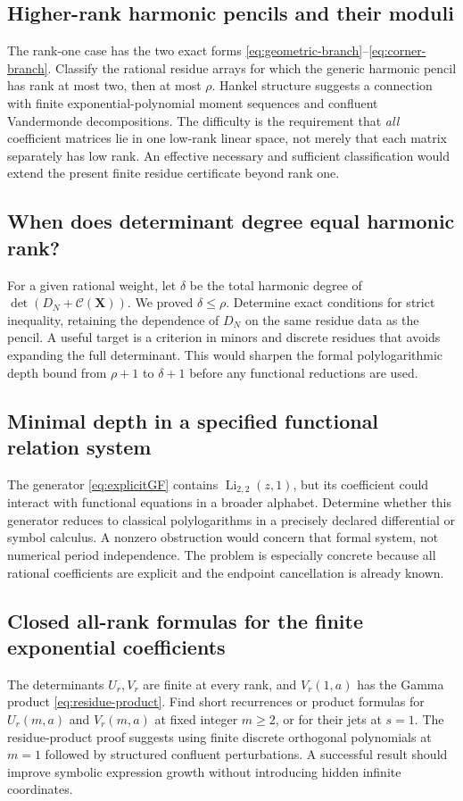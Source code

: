 \documentclass[11pt,letterpaper]{article}
\numberwithin{equation}{section}
\theoremstyle{definition}\newtheorem{definition}[theorem]{Definition}
\theoremstyle{remark}\newtheorem{remark}[theorem]{Remark}
\DeclareMathOperator{\Li}{Li}
\begin{document}
\subsection{Higher-rank harmonic pencils and their moduli}
The rank-one case has the two exact forms
\eqref{eq:geometric-branch}--\eqref{eq:corner-branch}. Classify the
rational residue arrays for which the generic harmonic pencil has rank
at most two, then at most $\rho$. Hankel structure suggests a connection
with finite exponential-polynomial moment sequences and confluent
Vandermonde decompositions. The difficulty is the requirement that
\emph{all} coefficient matrices lie in one low-rank linear space, not
merely that each matrix separately has low rank. An effective necessary
and sufficient classification would extend the present finite residue
certificate beyond rank one.

\subsection{When does determinant degree equal harmonic rank?}
For a given rational weight, let $\delta$ be the total harmonic degree
of $\det(D_N+\mathscr C(\bm X))$. We proved $\delta\le\rho$.
Determine exact conditions for strict inequality, retaining the dependence
of $D_N$ on the same residue data as the pencil. A useful target is a
criterion in minors and discrete residues that avoids expanding the full
determinant. This would sharpen the formal polylogarithmic depth bound
from $\rho+1$ to $\delta+1$ before any functional reductions are used.

\subsection{Minimal depth in a specified functional relation system}
The generator \eqref{eq:explicitGF} contains $\Li_{2,2}(z,1)$, but
its coefficient could interact with functional equations in a broader
alphabet. Determine whether this generator reduces to classical
polylogarithms in a precisely declared differential or symbol calculus.
A nonzero obstruction would concern that formal system, not numerical
period independence. The problem is especially concrete because all
rational coefficients are explicit and the endpoint cancellation is
already known.

\subsection{Closed all-rank formulas for the finite exponential coefficients}
The determinants $U_r,V_r$ are finite at every rank, and $V_r(1,a)$
has the Gamma product \eqref{eq:residue-product}. Find short recurrences
or product formulas for $U_r(m,a)$ and $V_r(m,a)$ at fixed integer
$m\ge2$, or for their jets at $s=1$. The residue-product proof suggests
using finite discrete orthogonal polynomials at $m=1$ followed by
structured confluent perturbations. A successful result should improve
symbolic expression growth without introducing hidden infinite coordinates.
\end{document}
